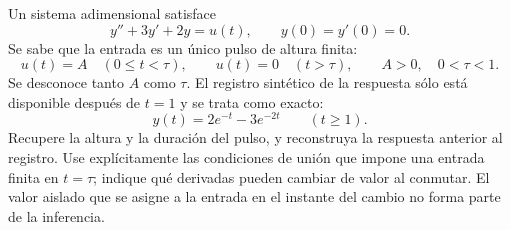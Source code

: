 Un sistema adimensional satisface
\[
y''+3y'+2y=u(t),\qquad y(0)=y'(0)=0.
\]
Se sabe que la entrada es un único pulso de altura finita:
\[
u(t)=A\quad(0\le t<\tau),\qquad
u(t)=0\quad(t>\tau),\qquad A>0,\quad0<\tau<1.
\]
Se desconoce tanto \(A\) como \(\tau\). El registro sintético de la respuesta sólo está disponible después de \(t=1\) y se trata como exacto:
\[
y(t)=2e^{-t}-3e^{-2t}\qquad(t\ge1).
\]
Recupere la altura y la duración del pulso, y reconstruya la respuesta anterior al registro. Use explícitamente las condiciones de unión que impone una entrada finita en \(t=\tau\); indique qué derivadas pueden cambiar de valor al conmutar. El valor aislado que se asigne a la entrada en el instante del cambio no forma parte de la inferencia.
